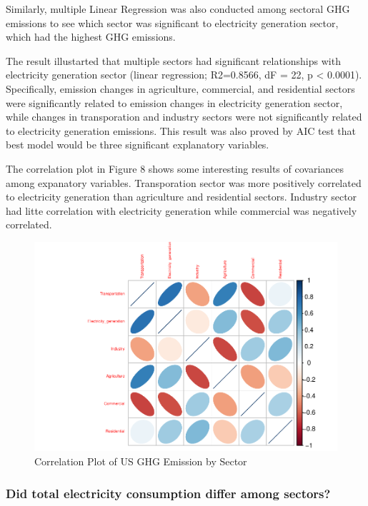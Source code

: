 \documentclass[12pt,]{article}
\begin{document}
\newpage

Similarly, multiple Linear Regression was also conducted among sectoral
GHG emissions to see which sector was significant to electricity
generation sector, which had the highest GHG emissions.

The result illustarted that multiple sectors had significant
relationships with electricity generation sector (linear regression;
R2=0.8566, dF = 22, p \textless{} 0.0001). Specifically, emission
changes in agriculture, commercial, and residential sectors were
significantly related to emission changes in electricity generation
sector, while changes in transporation and industry sectors were not
significantly related to electricity generation emissions. This result
was also proved by AIC test that best model would be three significant
explanatory variables.

The correlation plot in Figure 8 shows some interesting results of
covariances among expanatory variables. Transporation sector was more
positively correlated to electricity generation than agriculture and
residential sectors. Industry sector had litte correlation with
electricity generation while commercial was negatively correlated.

\begin{figure}
\centering
\includegraphics{Project_Code_files/figure-latex/unnamed-chunk-23-1.pdf}
\caption{Correlation Plot of US GHG Emission by Sector}
\end{figure}

\newpage

\subsubsection{Did total electricity consumption differ among
sectors?}\label{did-total-electricity-consumption-differ-among-sectors}
\end{document}
